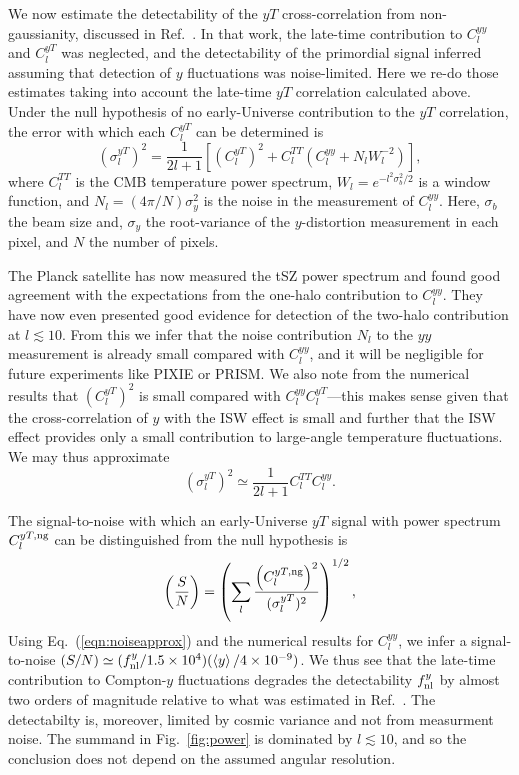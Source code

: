 \documentclass[aps,twocolumn,floats,prd,nofootinbib]{revtex4-1}
\def\VEV#1{\left\langle #1 \right\rangle}
\begin{document}
We now estimate the detectability of the $yT$ cross-correlation
from non-gaussianity, discussed in Ref.~\cite{Emami:2015xqa}.
In that work, the late-time contribution to $C_l^{yy}$ and
$C_l^{yT}$ was neglected, and the detectability of the
primordial signal inferred assuming that detection of $y$
fluctuations was noise-limited.  Here we re-do those estimates
taking into account the late-time $yT$ correlation calculated
above.  Under the null hypothesis of no early-Universe
contribution to the $yT$ correlation, the error with which
each $C_l^{yT}$ can be determined is
\begin{equation}
     \left(\sigma_l^{yT} \right)^2 =\frac{1}{2l+1} \left[ \left(
     C_l^{yT} \right)^2 + C_l^{TT}\left(
     C_l^{yy} + N_lW_l^{-2} \right)\right], 
\end{equation}
where $C_l^{TT}$ is the CMB temperature power spectrum,
$W_l = e^{-l^2\sigma_b^2/2}$ is a window function, and $ N_l
= (4\pi/N)\sigma_y^2$ is the noise in the measurement of
$C_l^{yy}$.  Here, $\sigma_b$ the beam size and, $\sigma_y$ the
root-variance of the $y$-distortion measurement in each
pixel, and $N$ the number of pixels.

The Planck satellite has now measured the tSZ power spectrum and
found good agreement with the expectations from the one-halo
contribution to $C_l^{yy}$.  They have now even presented good
evidence for detection of the two-halo contribution at
$l\lesssim 10$.  From this we infer that the noise contribution
$N_l$ to the $yy$ measurement is already small compared with
$C_l^{yy}$, and it will be negligible for future experiments
like PIXIE or PRISM.  We also note from the numerical results
that $\left(C_l^{yT}\right)^2$ is small compared with $C_l^{yy}
C_l^{yT}$---this makes sense given that the cross-correlation of
$y$ with the ISW effect is small and further that the ISW effect
provides only a small contribution to large-angle temperature
fluctuations.  We may thus approximate
\begin{equation}
     \left(\sigma_l^{yT} \right)^2 \simeq \frac{1}{2l+1}
     C_l^{TT} C_l^{yy}.
\label{eqn:noiseapprox}     
\end{equation}

The signal-to-noise with which an early-Universe
$yT$ signal with power spectrum $C_l^{yT,{\rm ng}}$ can be
distinguished from the null hypothesis is
\begin{equation}
     \left(\frac{S}{N} \right) = \left(\sum_l\frac{\left(C_l^{yT,{\rm ng}}
     \right)^2}{(\sigma_l^{yT})^2}\right)^{1/2},
\label{eqn:SN}
\end{equation}
Using Eq.~(\ref{eqn:noiseapprox}) and the numerical results for
$C_l^{yy}$, we infer a signal-to-noise $(S/N) \simeq  (f_{\rm
nl}^y/1.5\times 10^4) (\VEV{y}/4\times 10^{-9})$.  We thus see
that the late-time contribution to Compton-$y$ fluctuations
degrades the detectability $f_{\rm nl}^y$ by almost two orders
of magnitude relative to what was estimated in
Ref.~\cite{Emami:2015xqa}.  The detectabilty is, moreover,
limited by cosmic variance and not from measurment noise.
The summand in Fig.~\ref{fig:power} is dominated by $l\lesssim
10$, and so the conclusion does not depend on the assumed
angular resolution.
\end{document}
